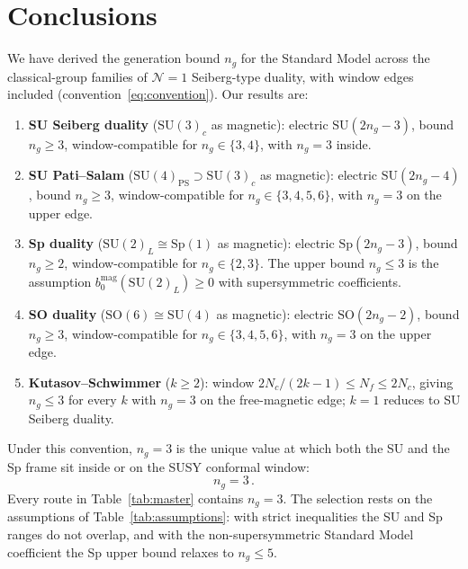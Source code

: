 \documentclass[11pt,a4paper]{article}
\theoremstyle{plain}
\theoremstyle{definition}
\theoremstyle{remark}
\newcommand{\Nc}{N_{\!c}}
\newcommand{\Nf}{N_{\!f}}
\newcommand{\ngen}{n_g}
\newcommand{\SU}[1]{\mathrm{SU}(#1)}
\newcommand{\SO}[1]{\mathrm{SO}(#1)}
\newcommand{\Sp}[1]{\mathrm{Sp}(#1)}
\begin{document}
\section{Conclusions}
\label{sec:conclusions}

We have derived the generation bound $\ngen$ for the Standard Model
across the classical-group families of $\mathcal{N}=1$ Seiberg-type
duality, with window edges included
(convention~\eqref{eq:convention}).  Our results are:

\begin{enumerate}
  \item \textbf{SU Seiberg duality} ($\SU{3}_c$ as magnetic):
    electric $\SU{2\ngen - 3}$, bound $\ngen \geq 3$, window-compatible
    for $\ngen \in \{3, 4\}$, with $\ngen = 3$ inside.

  \item \textbf{SU Pati--Salam} ($\SU{4}_{\mathrm{PS}} \supset \SU{3}_c$
    as magnetic): electric $\SU{2\ngen - 4}$, bound $\ngen \geq 3$,
    window-compatible for $\ngen \in \{3, 4, 5, 6\}$, with $\ngen = 3$ on
    the upper edge.

  \item \textbf{Sp duality} ($\SU{2}_L \cong \Sp{1}$ as magnetic):
    electric $\Sp{2\ngen - 3}$, bound $\ngen \geq 2$, window-compatible
    for $\ngen \in \{2, 3\}$.  The upper bound $\ngen \leq 3$ is the
    assumption $b_0^{\mathrm{mag}}(\SU{2}_L) \geq 0$ with supersymmetric
    coefficients.

  \item \textbf{SO duality} ($\SO{6} \cong \SU{4}$ as magnetic):
    electric $\SO{2\ngen - 2}$, bound $\ngen \geq 3$, window-compatible
    for $\ngen \in \{3, 4, 5, 6\}$, with $\ngen = 3$ on the upper edge.

  \item \textbf{Kutasov--Schwimmer} ($k \geq 2$): window
    $2\Nc/(2k-1) \leq \Nf \leq 2\Nc$, giving $\ngen \leq 3$ for every $k$
    with $\ngen = 3$ on the free-magnetic edge; $k = 1$ reduces to SU
    Seiberg duality.
\end{enumerate}

Under this convention, $\ngen = 3$ is the unique value at which both the
SU and the Sp frame sit inside or on the SUSY conformal window:
\begin{equation}
  \boxed{\ngen = 3}\,.
\end{equation}
Every route in Table~\ref{tab:master} contains $\ngen = 3$.  The
selection rests on the assumptions of Table~\ref{tab:assumptions}: with
strict inequalities the SU and Sp ranges do not overlap, and with the
non-supersymmetric Standard Model coefficient the Sp upper bound relaxes
to $\ngen \leq 5$.
\end{document}
